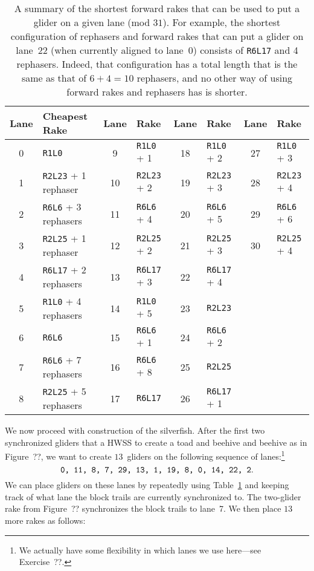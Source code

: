 \begin{table}[!htbp]
	\centering
	\begin{tabular}{c l | c l | c l | c l}
		\toprule
		Lane & Cheapest Rake & Lane & Rake & Lane & Rake & Lane & Rake \\ \midrule
		0 & \texttt{R1L0} & 9 & \texttt{R1L0} + 1 & 18 & \texttt{R1L0} + 2 & 27 & \texttt{R1L0} + 3 \\
		1 & \texttt{R2L23} + 1 rephaser & 10 & \texttt{R2L23} + 2 & 19 & \texttt{R2L23} + 3 & 28 & \texttt{R2L23} + 4\\
		2 & \texttt{R6L6} + 3 rephasers & 11 & \texttt{R6L6} + 4 & 20 & \texttt{R6L6} + 5 & 29 & \texttt{R6L6} + 6 \\
		3 & \texttt{R2L25} + 1 rephaser & 12 & \texttt{R2L25} + 2 & 21 & \texttt{R2L25} + 3 & 30 & \texttt{R2L25} + 4 \\
		4 & \texttt{R6L17} + 2 rephasers & 13 & \texttt{R6L17} + 3 & 22 & \texttt{R6L17} + 4 & & \\
		5 & \texttt{R1L0} + 4 rephasers & 14 & \texttt{R1L0} + 5 & 23 & \texttt{R2L23} & & \\
		6 & \texttt{R6L6} & 15 & \texttt{R6L6} + 1 & 24 & \texttt{R6L6} + 2 & & \\
		7 & \texttt{R6L6} + 7 rephasers & 16 & \texttt{R6L6} + 8 & 25 & \texttt{R2L25} & & \\
		8 & \texttt{R2L25} + 5 rephasers & 17 & \texttt{R6L17} & 26 & \texttt{R6L17} + 1 & & \\
		\bottomrule
	\end{tabular}
	\caption{A summary of the shortest forward rakes that can be used to put a glider on a given lane (mod $31$). For example, the shortest configuration of rephasers and forward rakes that can put a glider on lane~22 (when currently aligned to lane~0) consists of \texttt{R6L17} and 4 rephasers. Indeed, that configuration has a total length that is the same as that of $6 + 4 = 10$ rephasers, and no other way of using forward rakes and rephasers has is shorter.}\label{tab:silverfish_forward_rakes}
\end{table}

We now proceed with construction of the silverfish. After the first two synchronized gliders that a HWSS to create a toad and beehive and beehive as in Figure~??, we want to create $13$~gliders on the following sequence of lanes:\footnote{We actually have some flexibility in which lanes we use here---see Exercise~??.}%
\[
	\text{\texttt{0, 11, 8, 7, 29, 13, 1, 19, 8, 0, 14, 22, 2}.}
\]
We can place gliders on these lanes by repeatedly using Table~\ref{tab:silverfish_forward_rakes} and keeping track of what lane the block trails are currently synchronized to. The two-glider rake from Figure~?? synchronizes the block trails to lane~7. We then place $13$ more rakes as follows:\smallskip

